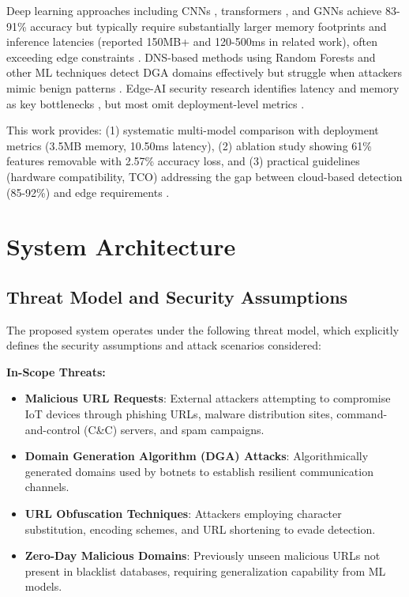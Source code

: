 \documentclass[conference]{IEEEtran}
\begin{document}
Deep learning approaches including CNNs \cite{ref_urlnet_2018}, transformers \cite{ref_transformer_phish_2022}, and GNNs \cite{ref_url_gnn_2024} achieve 83-91\% accuracy but typically require substantially larger memory footprints and inference latencies (reported 150MB+ and 120-500ms in related work), often exceeding edge constraints \cite{ref_transformer,ref_deep_learning_security,ref_gnn}. DNS-based methods using Random Forests \cite{ref_dns_detection} and other ML techniques \cite{ref_dga,ref_dns_ml_2023} detect DGA domains effectively but struggle when attackers mimic benign patterns \cite{ref_domain_generation,ref_botnet_detection}. Edge-AI security research \cite{ref_edge_ids_2023,ref_federated_iot_2024,ref_edge_ai_survey_2023} identifies latency and memory as key bottlenecks \cite{ref_edge_ai,ref_edge_computing_survey}, but most omit deployment-level metrics \cite{ref_cybersecurity_ml,ref_malware_detection}.

This work provides: (1) systematic multi-model comparison with deployment metrics (3.5MB memory, 10.50ms latency), (2) ablation study showing 61\% features removable with 2.57\% accuracy loss, and (3) practical guidelines (hardware compatibility, TCO) addressing the gap between cloud-based detection (85-92\%) and edge requirements \cite{ref_iot_gateway}.

\section{System Architecture}

\subsection{Threat Model and Security Assumptions}

The proposed system operates under the following threat model, which explicitly defines the security assumptions and attack scenarios considered:

\textbf{In-Scope Threats:}
\begin{itemize}
\item \textbf{Malicious URL Requests}: External attackers attempting to compromise IoT devices through phishing URLs, malware distribution sites, command-and-control (C\&C) servers, and spam campaigns.
\item \textbf{Domain Generation Algorithm (DGA) Attacks}: Algorithmically generated domains used by botnets to establish resilient communication channels.
\item \textbf{URL Obfuscation Techniques}: Attackers employing character substitution, encoding schemes, and URL shortening to evade detection.
\item \textbf{Zero-Day Malicious Domains}: Previously unseen malicious URLs not present in blacklist databases, requiring generalization capability from ML models.
\end{itemize}
\end{document}
